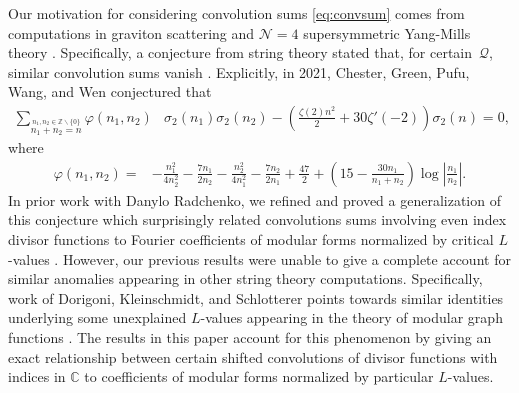 \documentclass[]{article}
\newcommand{\kf}[1]{{\color{magenta}{#1}}}
\begin{document}
Our motivation for considering convolution sums \eqref{eq:convsum} comes from computations in graviton scattering and $\mathcal{N}=4$ supersymmetric Yang-Mills theory \cite{CGPWW2021, SDK}. 
Specifically, a conjecture from string theory stated that, for certain~$\mathcal{Q}$, similar convolution sums vanish \cites{fedosova2024shifted, CGPWW2021, SDK}.
Explicitly, in 2021, Chester, Green, Pufu, Wang, and Wen conjectured that \cite[Section C.1(a)]{CGPWW2021}
\begin{equation}\label{eq:conj}
\begin{split}
\displaystyle\sum_{\stackrel{n_1, n_2 \in \mathbb{Z} \smallsetminus \{ 0\}}{n_1+n_2=n}} \varphi(n_1,n_2) & \sigma_2(n_1) \sigma_2(n_2) 
-
\left( \frac{\zeta(2) n^2}{2} + 30 \zeta'(-2)\right)\sigma_2(n) =0 ,
\end{split}
\end{equation}
where 
\begin{equation} 
\begin{split}
\varphi(n_1,n_2)= & -\frac{n_1^2}{4 n_2^2}-\frac{7 n_1}{2 n_2}-\frac{n_2^2}{4 n_1^2}-\frac{7 n_2}{2 n_1}+\frac{47}{2} 
+\left(15-\frac{30 n_1}{n_1+n_2}\right) \log \left|\frac{n_1}{n_2}\right|.
\end{split}
\end{equation}
In prior work with Danylo Radchenko, we refined and proved a generalization of this conjecture which surprisingly related convolutions sums involving even index divisor functions to Fourier coefficients of modular forms normalized by critical $L$-values \cite{FKLR}. 
However, %
our previous results were unable to give a complete account for similar anomalies appearing in other string theory computations. 
Specifically, work of Dorigoni, Kleinschmidt, and Schlotterer points towards similar identities underlying some unexplained $L$-values appearing in the theory of modular graph functions 
\cite{DKS2021_2}. The results in this paper  account for this phenomenon
by giving an exact relationship between certain shifted convolutions of divisor functions with indices in $\mathbb{C}$ to coefficients of modular forms normalized by particular $L$-values. 
\end{document}

